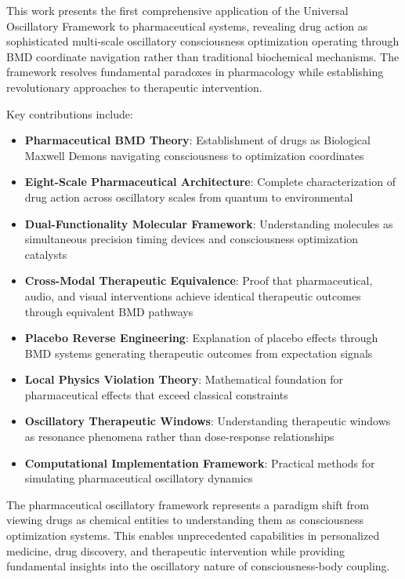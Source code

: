 \documentclass[12pt,a4paper]{article}
\begin{document}
This work presents the first comprehensive application of the Universal Oscillatory Framework to pharmaceutical systems, revealing drug action as sophisticated multi-scale oscillatory consciousness optimization operating through BMD coordinate navigation rather than traditional biochemical mechanisms. The framework resolves fundamental paradoxes in pharmacology while establishing revolutionary approaches to therapeutic intervention.

Key contributions include:

\begin{itemize}
\item \textbf{Pharmaceutical BMD Theory}: Establishment of drugs as Biological Maxwell Demons navigating consciousness to optimization coordinates
\item \textbf{Eight-Scale Pharmaceutical Architecture}: Complete characterization of drug action across oscillatory scales from quantum to environmental
\item \textbf{Dual-Functionality Molecular Framework}: Understanding molecules as simultaneous precision timing devices and consciousness optimization catalysts
\item \textbf{Cross-Modal Therapeutic Equivalence}: Proof that pharmaceutical, audio, and visual interventions achieve identical therapeutic outcomes through equivalent BMD pathways
\item \textbf{Placebo Reverse Engineering}: Explanation of placebo effects through BMD systems generating therapeutic outcomes from expectation signals
\item \textbf{Local Physics Violation Theory}: Mathematical foundation for pharmaceutical effects that exceed classical constraints
\item \textbf{Oscillatory Therapeutic Windows}: Understanding therapeutic windows as resonance phenomena rather than dose-response relationships
\item \textbf{Computational Implementation Framework}: Practical methods for simulating pharmaceutical oscillatory dynamics
\end{itemize}

The pharmaceutical oscillatory framework represents a paradigm shift from viewing drugs as chemical entities to understanding them as consciousness optimization systems. This enables unprecedented capabilities in personalized medicine, drug discovery, and therapeutic intervention while providing fundamental insights into the oscillatory nature of consciousness-body coupling.
\end{document}
